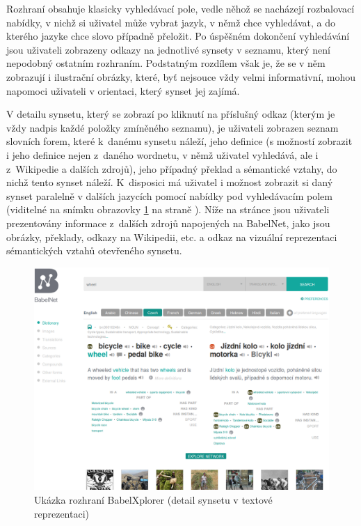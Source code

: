 \documentclass[a4paper, 11pt, oneside, showtrims]{book}
\begin{document}
					Rozhraní obsahuje klasicky vyhledávací pole, vedle něhož se nacházejí rozbalovací nabídky, v nichž si uživatel může vybrat jazyk, v němž chce vyhledávat, a do kterého jazyke chce slovo případně přeložit. Po úspěšném dokončení vyhledávání jsou uživateli zobrazeny odkazy na jednotlivé synsety v seznamu, který není nepodobný ostatním rozhraním. Podstatným rozdílem však je, že se v něm zobrazují i ilustrační obrázky, které, byť nejsouce vždy velmi informativní, mohou napomoci uživateli v orientaci, který synset jej zajímá. 

					V detailu synsetu, který se zobrazí po kliknutí na příslušný odkaz (kterým je vždy nadpis každé položky zmíněného seznamu), je uživateli zobrazen seznam slovních forem, které k~danému synsetu náleží, jeho definice (s možností zobrazit i jeho definice nejen z~daného wordnetu, v němž uživatel vyhledává, ale i z~Wikipedie a dalších zdrojů), jeho případný překlad a sémantické vztahy, do nichž tento synset náleží. K~disposici má uživatel i možnost zobrazit si daný synset paralelně v dalších jazycích pomocí nabídky pod vyhledávacím polem (viditelné na snímku obrazovky \ref{fig:babelxplorer} na straně \pageref{fig:babelxplorer}). Níže na stránce jsou uživateli prezentovány informace z~dalších zdrojů napojených na BabelNet, jako jsou obrázky, překlady, odkazy na Wikipedii, etc. a odkaz na vizuální reprezentaci sémantických vztahů otevřeného synsetu. 

					\begin{figure}[h]
						\centering
						\includegraphics[width=1.0\textwidth]{babelxplorer.png}
						\caption{Ukázka rozhraní BabelXplorer (detail synsetu v textové reprezentaci)}
						\label{fig:babelxplorer}
					\end{figure}
\end{document}
